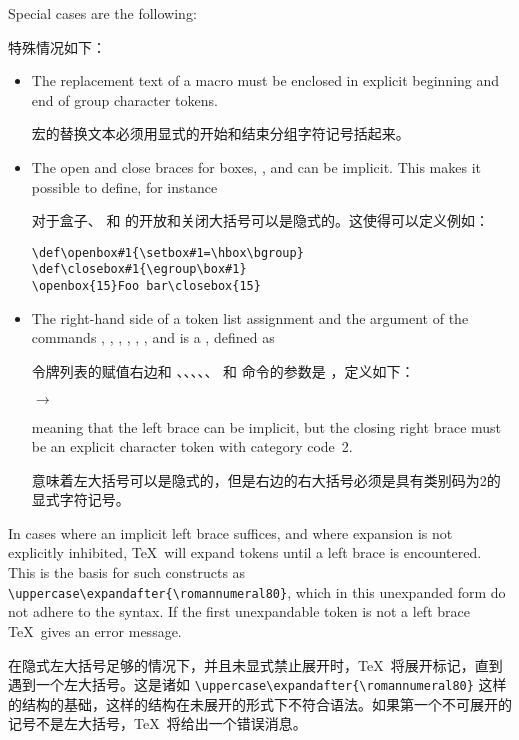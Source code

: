 Special cases are the following:

特殊情况如下：
\begin{itemize} \item The replacement text of a macro must be enclosed
in  explicit beginning and end of group character tokens.

宏的替换文本必须用显式的开始和结束分组字符记号括起来。
\item  The open and close braces for boxes, ,
and  can be implicit. This makes it possible
to define, for instance

对于盒子、 和  的开放和关闭大括号可以是隐式的。这使得可以定义例如：
\begin{verbatim}
\def\openbox#1{\setbox#1=\hbox\bgroup}
\def\closebox#1{\egroup\box#1}
\openbox{15}Foo bar\closebox{15}
\end{verbatim}
\item The right-hand side of a token list assignment and the
argument of the commands , , , 
, , 
, and  is a , defined
as

令牌列表的赋值右边和 、、、、、 和  命令的参数是 ，定义如下：
\begin{Disp}  $\longrightarrow$ \lb
      \end{Disp}
meaning that the left brace can be implicit, but the closing
right brace must be an explicit character token with category
code~2. 

意味着左大括号可以是隐式的，但是右边的右大括号必须是具有类别码为2的显式字符记号。
\end{itemize}

In cases where an implicit left brace suffices, and where
expansion is not explicitly inhibited, \TeX\ will
expand tokens until a left brace is encountered. This
is the basis for such constructs as
\verb=\uppercase\expandafter{\romannumeral80}=,
which in this unexpanded form do not adhere to the
syntax. If the first unexpandable token is not a left
brace \TeX\ gives an error message.

在隐式左大括号足够的情况下，并且未显式禁止展开时，\TeX\ 将展开标记，直到遇到一个左大括号。这是诸如 \verb=\uppercase\expandafter{\romannumeral80}= 这样的结构的基础，这样的结构在未展开的形式下不符合语法。如果第一个不可展开的记号不是左大括号，\TeX\ 将给出一个错误消息。

